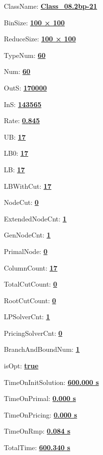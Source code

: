 \documentclass[11pt]{article}
\begin{document}
\pagestyle{empty}


ClassName: \underline{\textbf{Class_08.2bp-21}}
\par
BinSize: \underline{\textbf{100 × 100}}
\par
ReduceSize: \underline{\textbf{100 × 100}}
\par
TypeNum: \underline{\textbf{60}}
\par
Num: \underline{\textbf{60}}
\par
OutS: \underline{\textbf{170000}}
\par
InS: \underline{\textbf{143565}}
\par
Rate: \underline{\textbf{0.845}}
\par
UB: \underline{\textbf{17}}
\par
LB0: \underline{\textbf{17}}
\par
LB: \underline{\textbf{17}}
\par
LBWithCut: \underline{\textbf{17}}
\par
NodeCut: \underline{\textbf{0}}
\par
ExtendedNodeCnt: \underline{\textbf{1}}
\par
GenNodeCnt: \underline{\textbf{1}}
\par
PrimalNode: \underline{\textbf{0}}
\par
ColumnCount: \underline{\textbf{17}}
\par
TotalCutCount: \underline{\textbf{0}}
\par
RootCutCount: \underline{\textbf{0}}
\par
LPSolverCnt: \underline{\textbf{1}}
\par
PricingSolverCnt: \underline{\textbf{0}}
\par
BranchAndBoundNum: \underline{\textbf{1}}
\par
isOpt: \underline{\textbf{true}}
\par
TimeOnInitSolution: \underline{\textbf{600.000 s}}
\par
TimeOnPrimal: \underline{\textbf{0.000 s}}
\par
TimeOnPricing: \underline{\textbf{0.000 s}}
\par
TimeOnRmp: \underline{\textbf{0.084 s}}
\par
TotalTime: \underline{\textbf{600.340 s}}
\par
\newpage


\end{document}
